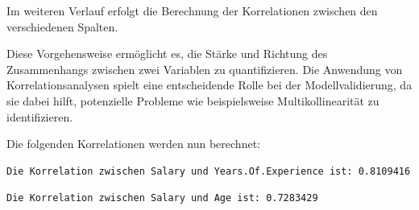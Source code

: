 \documentclass[
  letterpaper,
  DIV=11,
  numbers=noendperiod]{scrartcl}
\newenvironment{Shaded}{\begin{snugshade}}{\end{snugshade}}
\newcommand{\AttributeTok}[1]{\textcolor[rgb]{0.40,0.45,0.13}{#1}}
\newcommand{\CommentTok}[1]{\textcolor[rgb]{0.37,0.37,0.37}{#1}}
\newcommand{\FunctionTok}[1]{\textcolor[rgb]{0.28,0.35,0.67}{#1}}
\newcommand{\NormalTok}[1]{\textcolor[rgb]{0.00,0.23,0.31}{#1}}
\newcommand{\OtherTok}[1]{\textcolor[rgb]{0.00,0.23,0.31}{#1}}
\newcommand{\SpecialCharTok}[1]{\textcolor[rgb]{0.37,0.37,0.37}{#1}}
\newcommand{\StringTok}[1]{\textcolor[rgb]{0.13,0.47,0.30}{#1}}
\begin{document}
Im weiteren Verlauf erfolgt die Berechnung der Korrelationen zwischen
den verschiedenen Spalten.

Diese Vorgehensweise ermöglicht es, die Stärke und Richtung des
Zusammenhangs zwischen zwei Variablen zu quantifizieren. Die Anwendung
von Korrelationsanalysen spielt eine entscheidende Rolle bei der
Modellvalidierung, da sie dabei hilft, potenzielle Probleme wie
beispielsweise Multikollinearität zu identifizieren.

Die folgenden Korrelationen werden nun berechnet:

\begin{Shaded}
\end{Shaded}

\begin{verbatim}
Die Korrelation zwischen Salary und Years.Of.Experience ist: 0.8109416 
\end{verbatim}

\begin{Shaded}
\end{Shaded}

\begin{verbatim}
Die Korrelation zwischen Salary und Age ist: 0.7283429 
\end{verbatim}
\end{document}
